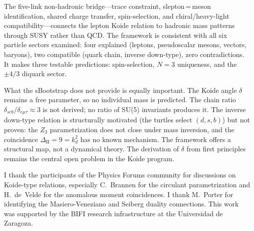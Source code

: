 \documentclass[prd,twocolumn,superscriptaddress,nofootinbib]{revtex4-2}
\begin{document}
The five-link non-hadronic bridge---trace constraint, slepton\,=\,meson
identification, shared charge transfer, spin-selection, and
chiral/heavy-light compatibility---connects the lepton Koide relation to
hadronic mass patterns through SUSY rather than QCD.  The framework is
consistent with all six particle sectors examined: four explained
(leptons, pseudoscalar mesons, vectors, baryons), two compatible
(quark chain, inverse down-type), zero contradictions.  It makes three
testable predictions: spin-selection, $N=3$ uniqueness, and the
$\pm 4/3$ diquark sector.

What the sBootstrap does not provide is equally important.  The Koide
angle $\delta$ remains a free parameter, so no individual mass is
predicted.  The chain ratio
$\delta_{scb}/\delta_{e\mu\tau}\approx 3$ is not derived; no ratio of
SU(5) invariants produces it.  The inverse down-type relation is
structurally motivated (the turtles select $(d,s,b)$) but not proven:
the $Z_3$ parametrization does not close under mass inversion, and the
coincidence $\Delta_{\text{II}}=9=k_d^2$ has no known mechanism.  The
framework offers a structural map, not a dynamical theory.  The
derivation of $\delta$ from first principles remains the central open
problem in the Koide program.

\begin{acknowledgments}
I thank the participants of the Physics Forums community for
discussions on Koide-type relations, especially C.~Brannen for the
circulant parametrization and H.~de~Velde for the anomalous moment
coincidences.  I thank M.~Porter for identifying the Masiero-Veneziano
and Seiberg duality connections.  This work was supported by the
BIFI research infrastructure at the Universidad de Zaragoza.
\end{acknowledgments}

\end{document}
